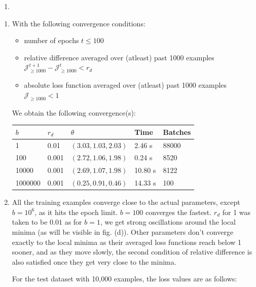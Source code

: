 \documentclass[12pt]{article}
\begin{document}
\begin{enumerate}
    \item 
\end{enumerate}

\begin{enumerate}[label=(\alph*)]
    \addtocounter{enumi}{1}
    \item With the following convergence conditions:
    \begin{itemize}
        \item number of epochs $t \le 100$
        \item relative difference averaged over (atleast) past 1000 examples $\mathcal{J}^{t+1}_{\ge 1000} - \mathcal{J}^{t}_{\ge 1000} < r_d$
        \item absolute loss function averaged over (atleast) past 1000 examples $\mathcal{J}_{\ge 1000} < 1$
    \end{itemize}

    We obtain the following convergence(s):

    \begin{center}
    \begin{tabular}{|l|l|l|l|l|}
        \hline
        $b$     & $r_d$ & $\theta$ & Time & Batches \\
        \hline
        1       & 0.01  & $(3.03,1.03,2.03)$ & 2.46 s & 88000 \\
        100     & 0.001 & $(2.72,1.06,1.98)$ & 0.24 s & 8520 \\
        10000   & 0.001 & $(2.69,1.07,1.98)$ & 10.80 s & 8122 \\
        1000000 & 0.001 & $(0.25,0.91,0.46)$ & 14.33 s & 100 \\
        \hline
    \end{tabular}
    \end{center}

    \item All the training examples converge close to the actual parameters, except $b=10^6$, as it hits the epoch limit. $b=100$ converges the fastest. $r_d$ for 1 was taken to be $0.01$ as for $b=1$, we get strong oscillations around the local minima (as will be visible in fig. (d)). Other parameters don't converge exactly to the local minima as their averaged loss functions reach below 1 sooner, and as they move slowly, the second condition of relative difference is also satisfied once they get very close to the minima. 

    For the test dataset with 10,000 examples, the loss values are as follows:


\end{enumerate}
\end{document}

